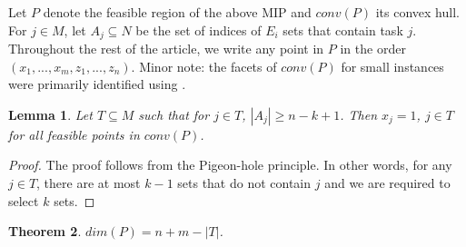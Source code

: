 \documentclass[12pt]{article}
\newtheorem{thm}{Theorem}
\newtheorem{lem}[thm]{Lemma}
\begin{document}
Let $P$ denote the feasible region of the above MIP and $conv(P)$ its convex hull. For $j \in M$, let $A_j \subseteq N$ be the set of indices of $E_i$ sets that contain task $j$. Throughout the rest of the article, we write any point in $P$ in the order $(x_1,...,x_m,z_1,...,z_n)$. Minor note: the facets of $conv(P)$ for small instances were primarily identified using \cite{polymake}.\\

\begin{lem} \label{lem:php}
Let $T \subseteq M$ such that for $j \in T$, $|A_j| \geq n-k+1$. Then $x_j=1$, $j \in T$ for all feasible points in $conv(P)$.
\end{lem}

\begin{proof}
The proof follows from the Pigeon-hole principle. In other words, for any $j \in T$, there are at most $k-1$ sets that do not contain $j$ and we are required to select $k$ sets.
\end{proof}

\begin{thm} \label{thm:dim}
$dim(P) = n + m - |T|$.
\end{thm}
\end{document}
